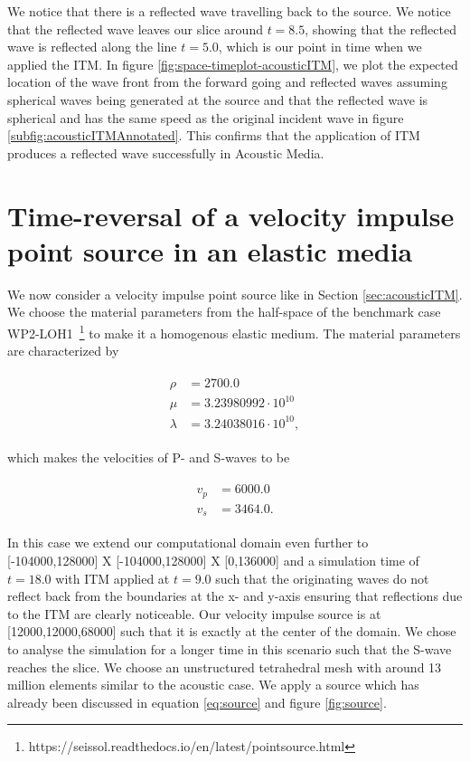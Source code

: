 We notice that there is a reflected wave travelling back to the source. We notice that the reflected wave leaves our slice around $t=8.5$, showing that the reflected wave
is reflected along the line $t=5.0$, which is our point in time when we applied the \ac{ITM}. In figure \ref{fig:space-timeplot-acousticITM}, we plot the expected
location of the wave front from the forward going and reflected waves assuming spherical waves being generated at the source and that the reflected wave is spherical
and has the same speed as the original incident wave in figure \ref{subfig:acousticITMAnnotated}. This confirms that the application of \ac{ITM} produces a reflected wave
successfully in Acoustic Media. \\

\section{Time-reversal of a velocity impulse point source in an elastic media} \label{sec:elasticITM}
We now consider a velocity impulse point source like in Section \ref{sec:acousticITM}. We choose the material parameters from the half-space of the 
benchmark case WP2-LOH1~\footnote[1]{https://seissol.readthedocs.io/en/latest/pointsource.html} to make it a homogenous elastic medium. The material parameters 
are characterized by

\begin{align}
    \begin{split}
        \rho &=    2700.0 \\
        \mu &=     3.23980992 \cdot 10^{10} \\
        \lambda &= 3.24038016 \cdot 10^{10} ,
    \end{split}
\end{align}

which makes the velocities of P- and S-waves to be

\begin{align}
    \begin{split}
        v_p &= 6000.0 \\
        v_s &= 3464.0 .
    \end{split}
\end{align}

In this case we extend our computational domain even further to [-104000,128000] X [-104000,128000] X [0,136000] and a simulation time of $t=18.0$ with \ac{ITM} applied at $t=9.0$
such that the originating waves do not reflect back from the boundaries at the x- and y-axis ensuring that reflections due to the \ac{ITM} are clearly noticeable.
Our velocity impulse source is at [12000,12000,68000] such that it is exactly at the center of the domain.
We chose to analyse the simulation for a longer time in this scenario such that the S-wave reaches the slice. We choose an unstructured tetrahedral mesh with around 13 million elements similar to the acoustic case. 
We apply a source which has already been discussed in equation \ref{eq:source} and figure \ref{fig:source}. \\

